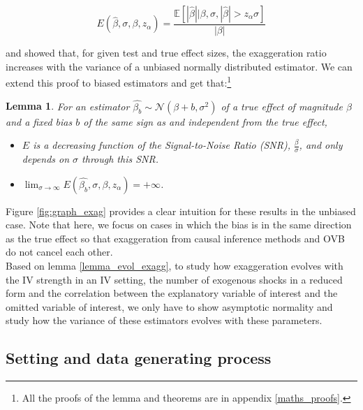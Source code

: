 \documentclass[usletter, 12pt]{article}
\newtheorem{lemma}{Lemma}
\begin{document}
				 \begin{equation}\label{exagg_general}
				 	E(\hat{\beta}, \sigma, \beta, z_{\alpha}) =
					 	\dfrac{\mathbb{E}\left[ | \hat{\beta} | \big| \beta, \sigma, |\hat{\beta}| > z_{\alpha} \sigma \right]}{| \beta |} 
				\end{equation}
				
			\cite{lu_note_2019} and \cite{zwet_significance_2021} showed that, for given test and true effect sizes, the exaggeration ratio increases with the variance of a unbiased normally distributed estimator. We can extend this proof to biased estimators and get that:\footnote{All the proofs of the lemma and theorems are in appendix \ref{maths_proofs}.}\label{lemma_evol_exagg}
			
			\begin{lemma}
			
				For an estimator $\hat{\beta_{b}}  \sim \mathcal{N}(\beta + b, \sigma^{2})$ of a true effect of magnitude $\beta$ and a fixed bias $b$ of the same sign as and independent from the true effect,
				
				\begin{itemize}
					\item $E$ is a decreasing function of the Signal-to-Noise Ratio (SNR), $\frac{\beta}{\sigma}$, and only depends on $\sigma$ through this SNR. 
					\item  $\lim_{\sigma\to \infty} E(\hat{\beta_{b}}, \sigma, \beta, z_{\alpha}) = +\infty$.
				\end{itemize}
			\end{lemma}
			
				Figure \ref{fig:graph_exag} provides a clear intuition for these results in the unbiased case. Note that here, we focus on cases in which the bias is in the same direction as the true effect so that exaggeration from causal inference methods and OVB do not cancel each other.\\
				 
				 Based on lemma \ref{lemma_evol_exagg}, to study how exaggeration evolves with the IV strength in an IV setting, the number of exogenous shocks in a reduced form and the correlation between the explanatory variable of interest and the omitted variable of interest, we only have to show asymptotic normality and study how the variance of these estimators evolves with these parameters.
				 				 
		\subsection{Setting and data generating process}\label{maths_dgp}
		
\end{document}
